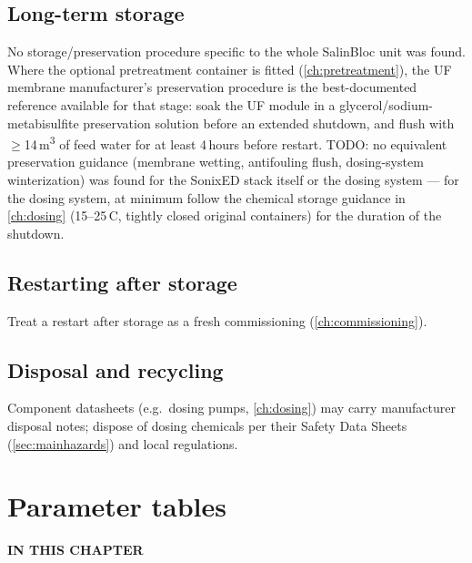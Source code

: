 \documentclass[a4paper,11pt,twoside,openright,numbers=noenddot]{scrreprt}
\newcommand{\chaptertoc}{%
  \begingroup
  \etocsetnexttocdepth{1}%
  \etocsettocstyle
    {{\sffamily\bfseries\footnotesize\color{hvmuted}IN THIS CHAPTER\par}%
     \vspace{5pt}{\color{hvink}\rule{\linewidth}{1.2pt}}\par\vspace{2pt}}{}%
  \etocsetstyle{section}{}{}
    {\par\vspace{4pt}\noindent
     \makebox[11mm][l]{\sffamily\bfseries\small\color{hvprimary}\etocnumber}%
     \sffamily\small\etocname\hfill{\color{hvmuted}\etocpage}%
     \par\vspace{4pt}{\color{hvrule}\rule{\linewidth}{0.4pt}}}{}%
  \localtableofcontents
  \endgroup}
\newcommand{\salinbloc}{SalinBloc\texttrademark\xspace}
\newcommand{\sonixed}{SonixED\texttrademark\xspace}
\begin{document}
\section{Long-term storage}
No storage/preservation procedure specific to the whole \salinbloc unit
was found. Where the optional pretreatment container is fitted
(\cref{ch:pretreatment}), the UF membrane manufacturer's preservation
procedure is the best-documented reference available for that stage:
soak the UF module in a
glycerol/sodium-metabisulfite preservation solution before an extended
shutdown, and flush with $\geq$14\,m\textsuperscript{3} of feed water for
at least 4\,hours before restart. TODO: no equivalent preservation
guidance (membrane wetting, antifouling flush, dosing-system
winterization) was found for the \sonixed stack itself or the dosing
system --- for the dosing system, at minimum follow the chemical storage
guidance in \cref{ch:dosing} (15--25\,\textdegree C, tightly closed
original containers) for the duration of the shutdown.

\section{Restarting after storage}
Treat a restart after storage as a fresh commissioning
(\cref{ch:commissioning}).

\section{Disposal and recycling}
Component datasheets (e.g.\ dosing pumps, \cref{ch:dosing}) may carry
manufacturer disposal notes; dispose of dosing chemicals per their Safety
Data Sheets (\cref{sec:mainhazards}) and local regulations.


\appendix

\chapter{Parameter tables}
\label{ch:appparams}
\chaptertoc
\end{document}
